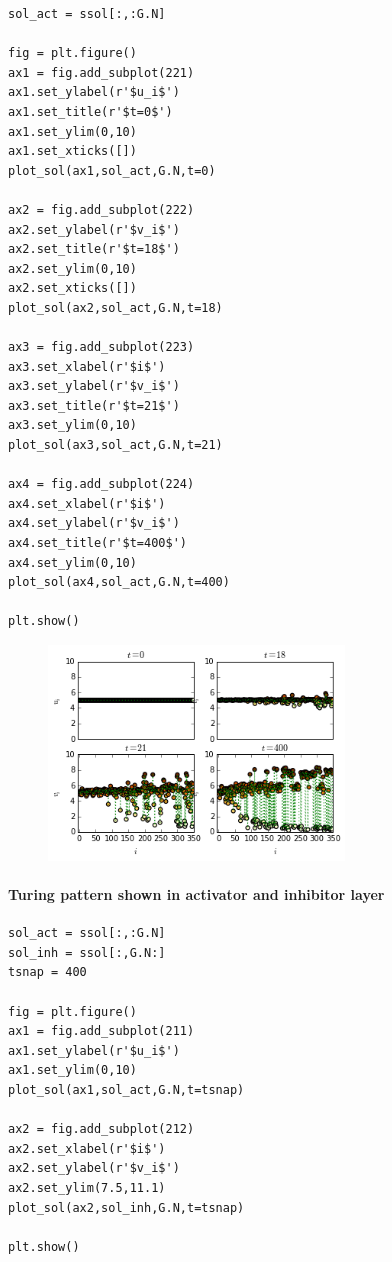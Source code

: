 \documentclass[11pt]{article}
\begin{document}
\begin{verbatim}
sol_act = ssol[:,:G.N]

fig = plt.figure()
ax1 = fig.add_subplot(221)
ax1.set_ylabel(r'$u_i$')
ax1.set_title(r'$t=0$')
ax1.set_ylim(0,10)
ax1.set_xticks([])
plot_sol(ax1,sol_act,G.N,t=0)

ax2 = fig.add_subplot(222)
ax2.set_ylabel(r'$v_i$')
ax2.set_title(r'$t=18$')
ax2.set_ylim(0,10)
ax2.set_xticks([])
plot_sol(ax2,sol_act,G.N,t=18)

ax3 = fig.add_subplot(223)
ax3.set_xlabel(r'$i$')
ax3.set_ylabel(r'$v_i$')
ax3.set_title(r'$t=21$')
ax3.set_ylim(0,10)
plot_sol(ax3,sol_act,G.N,t=21)

ax4 = fig.add_subplot(224)
ax4.set_xlabel(r'$i$')
ax4.set_ylabel(r'$v_i$')
ax4.set_title(r'$t=400$')
ax4.set_ylim(0,10)
plot_sol(ax4,sol_act,G.N,t=400)

plt.show()
\end{verbatim}

\begin{figure}[htbp]
\centering
\includegraphics[width=0.7\textwidth]{multiplex_turing_patterns_25_0.png}
\end{figure}

\paragraph{Turing pattern shown in activator and inhibitor
layer}\label{turing-pattern-shown-in-activator-and-inhibitor-layer}

\begin{verbatim}
sol_act = ssol[:,:G.N]
sol_inh = ssol[:,G.N:]
tsnap = 400

fig = plt.figure()
ax1 = fig.add_subplot(211)
ax1.set_ylabel(r'$u_i$')
ax1.set_ylim(0,10)
plot_sol(ax1,sol_act,G.N,t=tsnap)

ax2 = fig.add_subplot(212)
ax2.set_xlabel(r'$i$')
ax2.set_ylabel(r'$v_i$')
ax2.set_ylim(7.5,11.1)
plot_sol(ax2,sol_inh,G.N,t=tsnap)

plt.show()
\end{verbatim}
\end{document}
